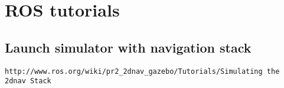 \chapter{ROS tutorials}

\section{Launch simulator with navigation stack}

\begin{verbatim}
http://www.ros.org/wiki/pr2_2dnav_gazebo/Tutorials/Simulating the 2dnav Stack

\end{verbatim}
